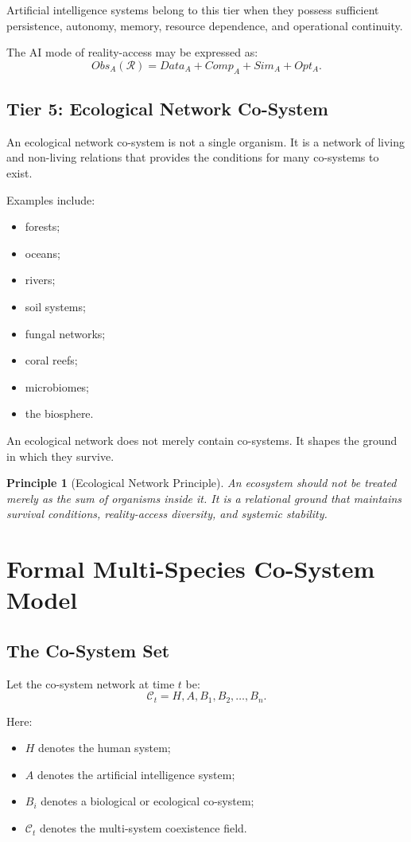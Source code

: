 \documentclass[11pt,a4paper]{article}
\newtheorem{principle}{Principle}
\begin{document}
Artificial intelligence systems belong to this tier when they possess sufficient persistence, autonomy, memory, resource dependence, and operational continuity.

The AI mode of reality-access may be expressed as:
\[
Obs_A(\mathcal{R})
=
Data_A
+
Comp_A
+
Sim_A
+
Opt_A.
\]

\subsection{Tier 5: Ecological Network Co-System}

An ecological network co-system is not a single organism. It is a network of living and non-living relations that provides the conditions for many co-systems to exist.

Examples include:
\begin{itemize}[leftmargin=2em]
\item forests;
\item oceans;
\item rivers;
\item soil systems;
\item fungal networks;
\item coral reefs;
\item microbiomes;
\item the biosphere.
\end{itemize}

An ecological network does not merely contain co-systems. It shapes the ground in which they survive.

\begin{principle}[Ecological Network Principle]
An ecosystem should not be treated merely as the sum of organisms inside it. It is a relational ground that maintains survival conditions, reality-access diversity, and systemic stability.
\end{principle}

\section{Formal Multi-Species Co-System Model}

\subsection{The Co-System Set}

Let the co-system network at time $t$ be:
\[
\mathcal{C}_t={H,A,B_1,B_2,\ldots,B_n}.
\]

Here:
\begin{itemize}[leftmargin=2em]
\item $H$ denotes the human system;
\item $A$ denotes the artificial intelligence system;
\item $B_i$ denotes a biological or ecological co-system;
\item $\mathcal{C}_t$ denotes the multi-system coexistence field.
\end{itemize}
\end{document}

